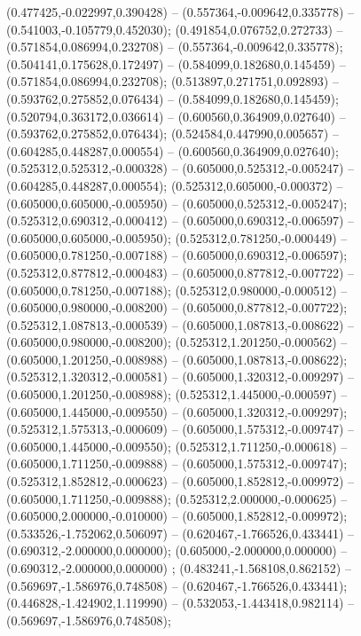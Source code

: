  (0.477425,-0.022997,0.390428) -- (0.557364,-0.009642,0.335778) -- (0.541003,-0.105779,0.452030);
 (0.491854,0.076752,0.272733) -- (0.571854,0.086994,0.232708) -- (0.557364,-0.009642,0.335778);
 (0.504141,0.175628,0.172497) -- (0.584099,0.182680,0.145459) -- (0.571854,0.086994,0.232708);
 (0.513897,0.271751,0.092893) -- (0.593762,0.275852,0.076434) -- (0.584099,0.182680,0.145459);
 (0.520794,0.363172,0.036614) -- (0.600560,0.364909,0.027640) -- (0.593762,0.275852,0.076434);
 (0.524584,0.447990,0.005657) -- (0.604285,0.448287,0.000554) -- (0.600560,0.364909,0.027640);
 (0.525312,0.525312,-0.000328) -- (0.605000,0.525312,-0.005247) -- (0.604285,0.448287,0.000554);
 (0.525312,0.605000,-0.000372) -- (0.605000,0.605000,-0.005950) -- (0.605000,0.525312,-0.005247);
 (0.525312,0.690312,-0.000412) -- (0.605000,0.690312,-0.006597) -- (0.605000,0.605000,-0.005950);
 (0.525312,0.781250,-0.000449) -- (0.605000,0.781250,-0.007188) -- (0.605000,0.690312,-0.006597);
 (0.525312,0.877812,-0.000483) -- (0.605000,0.877812,-0.007722) -- (0.605000,0.781250,-0.007188);
 (0.525312,0.980000,-0.000512) -- (0.605000,0.980000,-0.008200) -- (0.605000,0.877812,-0.007722);
 (0.525312,1.087813,-0.000539) -- (0.605000,1.087813,-0.008622) -- (0.605000,0.980000,-0.008200);
 (0.525312,1.201250,-0.000562) -- (0.605000,1.201250,-0.008988) -- (0.605000,1.087813,-0.008622);
 (0.525312,1.320312,-0.000581) -- (0.605000,1.320312,-0.009297) -- (0.605000,1.201250,-0.008988);
 (0.525312,1.445000,-0.000597) -- (0.605000,1.445000,-0.009550) -- (0.605000,1.320312,-0.009297);
 (0.525312,1.575313,-0.000609) -- (0.605000,1.575312,-0.009747) -- (0.605000,1.445000,-0.009550);
 (0.525312,1.711250,-0.000618) -- (0.605000,1.711250,-0.009888) -- (0.605000,1.575312,-0.009747);
 (0.525312,1.852812,-0.000623) -- (0.605000,1.852812,-0.009972) -- (0.605000,1.711250,-0.009888);
 (0.525312,2.000000,-0.000625) -- (0.605000,2.000000,-0.010000) -- (0.605000,1.852812,-0.009972);
 (0.533526,-1.752062,0.506097) -- (0.620467,-1.766526,0.433441) -- (0.690312,-2.000000,0.000000);
 (0.605000,-2.000000,0.000000) -- (0.690312,-2.000000,0.000000) ;
 (0.483241,-1.568108,0.862152) -- (0.569697,-1.586976,0.748508) -- (0.620467,-1.766526,0.433441);
 (0.446828,-1.424902,1.119990) -- (0.532053,-1.443418,0.982114) -- (0.569697,-1.586976,0.748508);
